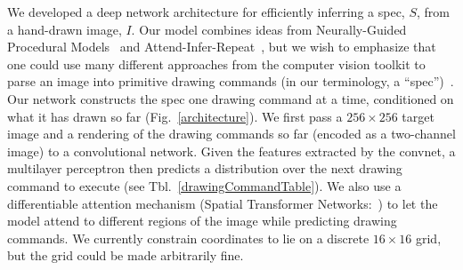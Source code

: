 \documentclass{article}
\newcommand{\remark}[1]{\textcolor{red}{[#1]}}
\theoremstyle{definition}
\begin{document}
We developed a deep network architecture for efficiently inferring a
spec, $S$, from a hand-drawn image, $I$.
Our model combines ideas from
Neurally-Guided Procedural Models~\citep{ritchie2016neurally}
and Attend-Infer-Repeat~\citep{eslami1603attend}, but
we wish to emphasize
that one could use
many different approaches from the computer vision toolkit to
parse an image into primitive drawing commands  (in our terminology, a ``spec'')~\cite{nsd}.
Our network constructs the
spec one drawing command at a time, conditioned on what it has drawn so far (Fig.~\ref{architecture}).
We first
pass a $256\times 256$ target image and a rendering of the drawing commands so
far (encoded as a two-channel image) to a convolutional network. Given
the features extracted by the convnet, a multilayer perceptron then
predicts a distribution over the next drawing command to execute
(see Tbl.~\ref{drawingCommandTable}).
We also use a
differentiable attention mechanism (Spatial Transformer
Networks:~\cite{jaderberg2015spatial}) to let the model attend to
different regions of the image while predicting drawing commands.
We currently constrain
coordinates to lie on a discrete $16\times 16$ grid,
but the grid could be made arbitrarily fine.  %
\end{document}
